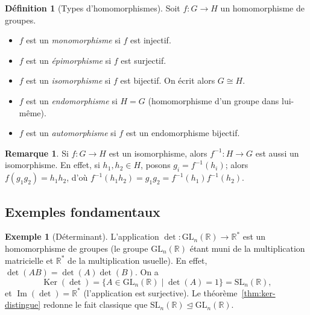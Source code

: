 \documentclass[12pt,a4paper,openany]{book}
\theoremstyle{definition}
\newtheorem{definition}{Définition}[chapter]
\newtheorem{remarque}{Remarque}[chapter]
\newtheorem{exemple}{Exemple}[chapter]
\newcommand{\R}{\mathbb{R}}
\DeclareMathOperator{\Ker}{Ker}
\renewcommand{\Im}{\operatorname{Im}}
\begin{document}
\begin{definition}[Types d'homomorphismes]\label{def:types-hom}
  Soit $f\colon G\to H$ un homomorphisme de groupes.
  \begin{itemize}
    \item $f$ est un \emph{monomorphisme}
      si $f$ est injectif.
    \item $f$ est un \emph{épimorphisme}
      si $f$ est surjectif.
    \item $f$ est un \emph{isomorphisme}
      si $f$ est bijectif.
      On écrit alors $G\cong H$.
    \item $f$ est un \emph{endomorphisme}
      si $H=G$ (homomorphisme d'un groupe dans lui-même).
    \item $f$ est un \emph{automorphisme}
      si $f$ est un endomorphisme bijectif.
  \end{itemize}
\end{definition}

\begin{remarque}\label{rem:iso-inverse}
  Si $f\colon G\to H$ est un isomorphisme, alors $f^{-1}\colon H\to G$
  est aussi un isomorphisme. En effet, si $h_1,h_2\in H$, posons
  $g_i=f^{-1}(h_i)$; alors $f(g_1g_2)=h_1h_2$, d'où
  $f^{-1}(h_1h_2)=g_1g_2=f^{-1}(h_1)f^{-1}(h_2)$.
\end{remarque}

\subsection{Exemples fondamentaux}\label{subsec:hom-exemples}

\begin{exemple}[Déterminant]\label{ex:hom-det}
  L'application $\det\colon\mathrm{GL}_n(\R)\to\R^*$
  est un homomorphisme de groupes (le groupe
  $\mathrm{GL}_n(\R)$ étant muni de la multiplication matricielle et
  $\R^*$ de la multiplication usuelle). En effet,
  $\det(AB)=\det(A)\det(B)$. On a
  \[
    \Ker(\det) = \{A\in\mathrm{GL}_n(\R)\mid \det(A)=1\} = \mathrm{SL}_n(\R),
  \]
  et $\Im(\det) = \R^*$ (l'application est surjective). Le
  théorème~\ref{thm:ker-distingue} redonne le fait classique que
  $\mathrm{SL}_n(\R)\trianglelefteq\mathrm{GL}_n(\R)$.
\end{exemple}
\end{document}
